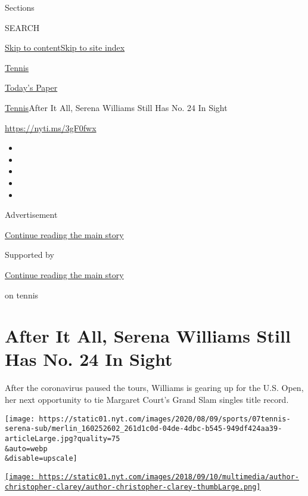 Sections

SEARCH

\protect\hyperlink{site-content}{Skip to
content}\protect\hyperlink{site-index}{Skip to site index}

\href{https://www.nytimes.com/section/sports/tennis}{Tennis}

\href{https://myaccount.nytimes.com/auth/login?response_type=cookie\&client_id=vi}{}

\href{https://www.nytimes.com/section/todayspaper}{Today's Paper}

\href{/section/sports/tennis}{Tennis}\textbar{}After It All, Serena
Williams Still Has No. 24 In Sight

\href{https://nyti.ms/3gF0fwx}{https://nyti.ms/3gF0fwx}

\begin{itemize}
\item
\item
\item
\item
\item
\end{itemize}

Advertisement

\protect\hyperlink{after-top}{Continue reading the main story}

Supported by

\protect\hyperlink{after-sponsor}{Continue reading the main story}

on tennis

\hypertarget{after-it-all-serena-williams-still-has-no-24-in-sight}{%
\section{After It All, Serena Williams Still Has No. 24 In
Sight}\label{after-it-all-serena-williams-still-has-no-24-in-sight}}

After the coronavirus paused the tours, Williams is gearing up for the
U.S. Open, her next opportunity to tie Margaret Court's Grand Slam
singles title record.

\texttt{[image: https://static01.nyt.com/images/2020/08/09/sports/07tennis-serena-sub/merlin\_160252602\_261d1c0d-04de-4dbc-b545-949df424aa39-articleLarge.jpg?quality=75\\\&auto=webp\\\&disable=upscale]}

\href{https://www.nytimes.com/by/christopher-clarey}{\texttt{[image: https://static01.nyt.com/images/2018/09/10/multimedia/author-christopher-clarey/author-christopher-clarey-thumbLarge.png]}}

